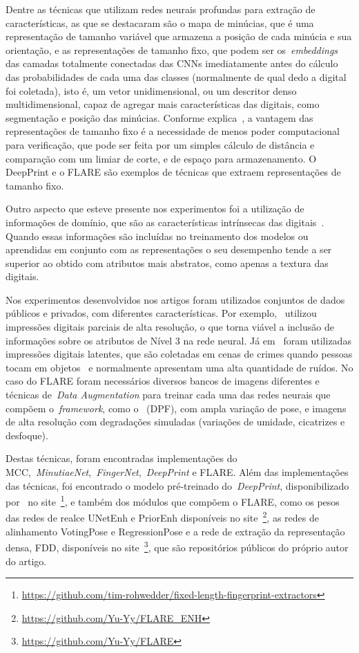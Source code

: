 Dentre as técnicas que utilizam redes neurais profundas para extração de características, as que se destacaram são o mapa de minúcias, que é uma representação de tamanho variável que armazena a posição de cada minúcia e sua orientação, e as representações de tamanho fixo, que podem ser os~\textit{embeddings} das camadas totalmente conectadas das CNNs imediatamente antes do cálculo das probabilidades de cada uma das classes (normalmente de qual dedo a digital foi coletada), isto é, um vetor unidimensional, ou um descritor denso multidimensional, capaz de agregar mais características das digitais, como segmentação e posição das minúcias. Conforme explica~, a vantagem das representações de tamanho fixo é a necessidade de menos poder computacional para verificação, que pode ser feita por um simples cálculo de distância e comparação com um limiar de corte, e de espaço para armazenamento. O DeepPrint e o FLARE são exemplos de técnicas que extraem representações de tamanho fixo.

Outro aspecto que esteve presente nos experimentos foi a utilização de informações de domínio, que são as características intrínsecas das digitais~\cite{handbook_of_fp_recognition}. Quando essas informações são incluídas no treinamento dos modelos ou aprendidas em conjunto com as representações o seu desempenho tende a ser superior ao obtido com atributos mais abstratos, como apenas a textura das digitais.

Nos experimentos desenvolvidos nos artigos foram utilizados conjuntos de dados públicos e privados, com diferentes características. Por exemplo,~ utilizou impressões digitais parciais de alta resolução, o que torna viável a inclusão de informações sobre os atributos de Nível 3 na rede neural. Já em~\cite{fcn} foram utilizadas impressões digitais latentes, que são coletadas em cenas de crimes quando pessoas tocam em objetos~\cite{handbook_of_fp_recognition} e normalmente apresentam uma alta quantidade de ruídos. No caso do FLARE foram necessários diversos bancos de imagens diferentes e técnicas de~\textit{Data Augmentation} para treinar cada uma das redes neurais que compõem o~\textit{framework}, como o~ (DPF), com ampla variação de pose, e imagens de alta resolução com degradações simuladas (variações de umidade, cicatrizes e desfoque).

Destas técnicas, foram encontradas implementações do MCC,~\textit{MinutiaeNet},~\textit{FingerNet},~\textit{DeepPrint} e FLARE. Além das implementações das técnicas, foi encontrado o modelo pré-treinado do~\textit{DeepPrint}, disponibilizado por~ no site~\footnote{\url{https://github.com/tim-rohwedder/fixed-length-fingerprint-extractors}}, e também dos módulos que compõem o FLARE, como os pesos das redes de realce UNetEnh e PriorEnh disponíveis no site~\footnote{\url{https://github.com/Yu-Yy/FLARE_ENH}}, as redes de alinhamento VotingPose e RegressionPose e a rede de extração da representação densa, FDD, disponíveis no site~\footnote{\url{https://github.com/Yu-Yy/FLARE}}, que são repositórios públicos do próprio autor do artigo.